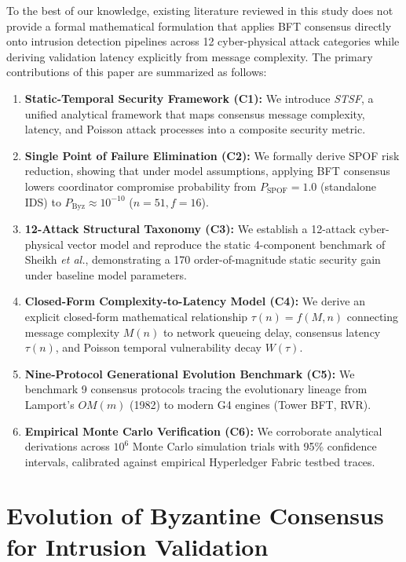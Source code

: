 \documentclass[10pt,twocolumn,journal]{IEEEtran}
\begin{document}
To the best of our knowledge, existing literature reviewed in this study does not provide a formal mathematical formulation that applies BFT consensus directly onto intrusion detection pipelines across 12 cyber-physical attack categories while deriving validation latency explicitly from message complexity. The primary contributions of this paper are summarized as follows:
\begin{enumerate}[leftmargin=*]
    \item \textbf{Static-Temporal Security Framework (C1):} We introduce \emph{STSF}, a unified analytical framework that maps consensus message complexity, latency, and Poisson attack processes into a composite security metric.
    \item \textbf{Single Point of Failure Elimination (C2):} We formally derive SPOF risk reduction, showing that under model assumptions, applying BFT consensus lowers coordinator compromise probability from $P_{\text{SPOF}} = 1.0$ (standalone IDS) to $P_{\text{Byz}} \approx 10^{-10}$ ($n=51, f=16$).
    \item \textbf{12-Attack Structural Taxonomy (C3):} We establish a 12-attack cyber-physical vector model and reproduce the static 4-component benchmark of Sheikh \textit{et al.}, demonstrating a 170 order-of-magnitude static security gain under baseline model parameters.
    \item \textbf{Closed-Form Complexity-to-Latency Model (C4):} We derive an explicit closed-form mathematical relationship $\tau(n) = f(M, n)$ connecting message complexity $M(n)$ to network queueing delay, consensus latency $\tau(n)$, and Poisson temporal vulnerability decay $W(\tau)$.
    \item \textbf{Nine-Protocol Generational Evolution Benchmark (C5):} We benchmark 9 consensus protocols tracing the evolutionary lineage from Lamport's $OM(m)$ (1982) to modern G4 engines (Tower BFT, RVR).
    \item \textbf{Empirical Monte Carlo Verification (C6):} We corroborate analytical derivations across $10^6$ Monte Carlo simulation trials with 95\% confidence intervals, calibrated against empirical Hyperledger Fabric testbed traces.
\end{enumerate}

\section{Evolution of Byzantine Consensus for Intrusion Validation}
\label{sec:consensus_evolution}
\end{document}
